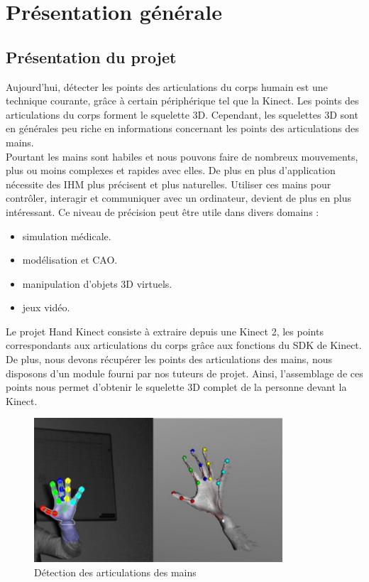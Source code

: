 \chapter{Présentation générale}



\section{Présentation du projet}
Aujourd'hui, détecter les points des articulations du corps humain 
est une technique courante, grâce à certain périphérique tel que la 
Kinect. Les points des articulations du corps forment le squelette 3D. 
Cependant, les squelettes 3D sont en générales peu riche en informations 
concernant les points des articulations des mains.\\
 
Pourtant les mains sont habiles et nous pouvons faire de nombreux 
mouvements, plus ou moins complexes et rapides avec elles. De plus en 
plus d'application nécessite des IHM plus précisent et plus 
naturelles. Utiliser ces mains pour contrôler, interagir et communiquer 
avec un ordinateur, devient de plus en plus intéressant. Ce niveau de 
précision peut être utile dans divers domains :
\begin{itemize}
  \item simulation médicale.
  \item modélisation et CAO.
  \item manipulation d'objets 3D virtuels.
  \item jeux vidéo.\\
\end{itemize}

Le projet \og Hand Kinect \fg consiste à extraire depuis une Kinect 2, 
les points correspondants aux articulations du corps grâce aux 
fonctions du SDK de Kinect. De plus, nous devons récupérer les points 
des articulations des mains, nous disposons d'un module fourni par 
nos tuteurs de projet. Ainsi, l'assemblage de ces points nous permet 
d'obtenir le squelette 3D complet de la personne devant la Kinect.\\

\begin{figure}[!h]
  \begin{center}
    \includegraphics[width=350px]{images/joint_detection.png}
    \caption{Détection des articulations des mains}
  \end{center}
\end{figure}

